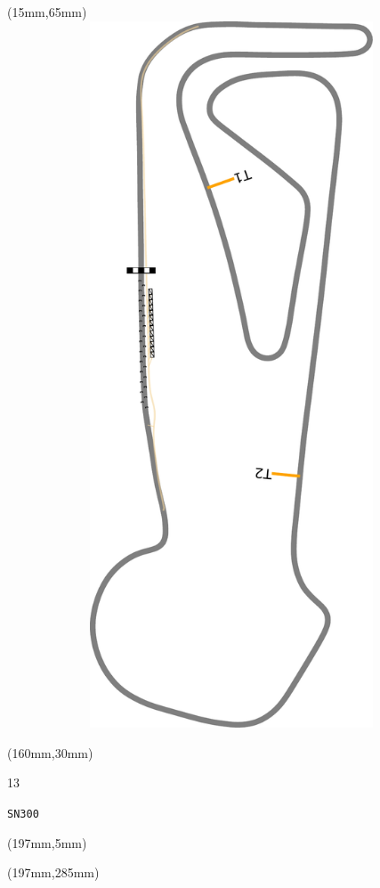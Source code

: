 \begin{textblock*}{185mm}(15mm,65mm)%
\centering
\mbox{\includegraphics[width=185mm,height=210mm,keepaspectratio]{PT/SN300.pdf}}
\end{textblock*}
\begin{textblock*}{40mm}(160mm,30mm)%
\Large
\par{} 
\par13 
\par\hfill\tiny\tt SN300\\
\end{textblock*}
\begin{textblock*}{20mm}(197mm,5mm)%
\fbox{\thepage}
\label{SN300}
\end{textblock*}
\begin{textblock*}{20mm}(197mm,285mm)%
\fbox{\thepage}
\end{textblock*}

